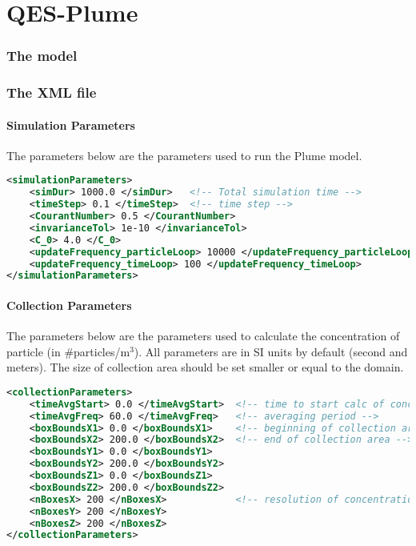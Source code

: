 \part{QES-Plume}

\section{The model}

\newpage
\section{The XML file}

\subsection{Simulation Parameters}

The parameters below are the parameters used to run the Plume model.

\begin{lstlisting}[language=XML]
<simulationParameters>
    <simDur> 1000.0 </simDur>   <!-- Total simulation time -->
    <timeStep> 0.1 </timeStep>  <!-- time step -->
    <CourantNumber> 0.5 </CourantNumber>
    <invarianceTol> 1e-10 </invarianceTol>
    <C_0> 4.0 </C_0>
    <updateFrequency_particleLoop> 10000 </updateFrequency_particleLoop>
    <updateFrequency_timeLoop> 100 </updateFrequency_timeLoop>
</simulationParameters>
\end{lstlisting}

\subsection{Collection Parameters}

The parameters below are the parameters used to calculate the concentration of particle (in \#particles/m$^{3}$). All parameters are in SI units by default (second and meters). The size of collection area should be set smaller or equal to the domain.
\begin{lstlisting}[language=XML]
<collectionParameters>
    <timeAvgStart> 0.0 </timeAvgStart>  <!-- time to start calc of concentration -->
    <timeAvgFreq> 60.0 </timeAvgFreq>   <!-- averaging period -->
    <boxBoundsX1> 0.0 </boxBoundsX1>    <!-- beginning of collection area -->
    <boxBoundsX2> 200.0 </boxBoundsX2>  <!-- end of collection area -->
    <boxBoundsY1> 0.0 </boxBoundsY1>
    <boxBoundsY2> 200.0 </boxBoundsY2>
    <boxBoundsZ1> 0.0 </boxBoundsZ1>
    <boxBoundsZ2> 200.0 </boxBoundsZ2>
    <nBoxesX> 200 </nBoxesX>            <!-- resolution of concentration -->
    <nBoxesY> 200 </nBoxesY>
    <nBoxesZ> 200 </nBoxesZ>
</collectionParameters>
\end{lstlisting}

